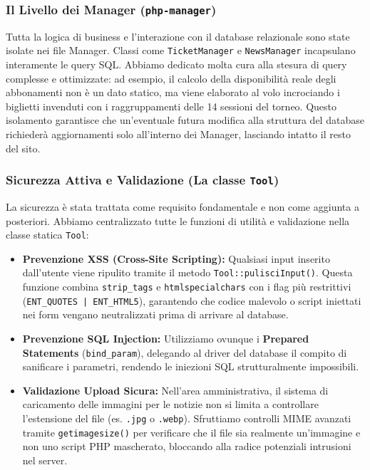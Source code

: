 \documentclass[11pt,a4paper]{article}
\begin{document}
\subsubsection{Il Livello dei Manager (\texttt{php-manager})}
Tutta la logica di business e l'interazione con il database relazionale sono state isolate nei file Manager. Classi come \texttt{TicketManager} e \texttt{NewsManager} incapsulano interamente le query SQL. Abbiamo dedicato molta cura alla stesura di query complesse e ottimizzate: ad esempio, il calcolo della disponibilità reale degli abbonamenti non è un dato statico, ma viene elaborato al volo incrociando i biglietti invenduti con i raggruppamenti delle 14 sessioni del torneo. Questo isolamento garantisce che un'eventuale futura modifica alla struttura del database richiederà aggiornamenti solo all'interno dei Manager, lasciando intatto il resto del sito.

\subsubsection{Sicurezza Attiva e Validazione (La classe \texttt{Tool})}
La sicurezza è stata trattata come requisito fondamentale e non come aggiunta a posteriori. Abbiamo centralizzato tutte le funzioni di utilità e validazione nella classe statica \texttt{Tool}:
\begin{itemize}
    \item \textbf{Prevenzione XSS (Cross-Site Scripting):} Qualsiasi input inserito dall'utente viene ripulito tramite il metodo \texttt{Tool::pulisciInput()}. Questa funzione combina \texttt{strip\_tags} e \texttt{htmlspecialchars} con i flag più restrittivi (\texttt{ENT\_QUOTES | ENT\_HTML5}), garantendo che codice malevolo o script iniettati nei form vengano neutralizzati prima di arrivare al database.
    \item \textbf{Prevenzione SQL Injection:} Utilizziamo ovunque i \textbf{Prepared Statements} (\texttt{bind\_param}), delegando al driver del database il compito di sanificare i parametri, rendendo le iniezioni SQL strutturalmente impossibili.
    \item \textbf{Validazione Upload Sicura:} Nell'area amministrativa, il sistema di caricamento delle immagini per le notizie non si limita a controllare l'estensione del file (es. \texttt{.jpg} o \texttt{.webp}). Sfruttiamo controlli MIME avanzati tramite \texttt{getimagesize()} per verificare che il file sia realmente un'immagine e non uno script PHP mascherato, bloccando alla radice potenziali intrusioni nel server.
\end{itemize}
\end{document}
